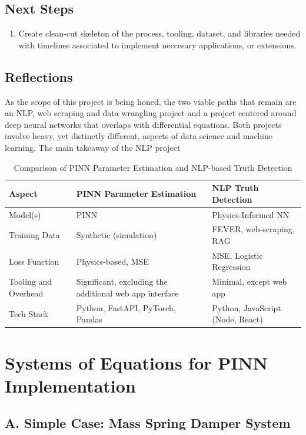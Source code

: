 \documentclass[11pt,letterpaper]{article}
\newcommand{\nextSteps}[1]{
    \subsection*{Next Steps}
    #1
}
\newcommand{\reflections}[1]{
    \subsection*{Reflections}
    #1
}
\begin{document}
\nextSteps{
\begin{enumerate}
    \item Create clean-cut skeleton of the process, tooling, dataset, and libraries needed with timelines associated to implement neccesary applications, or extensions.
\end{enumerate}
}

\reflections{
As the scope of this project is being honed, the two viable paths that remain are an NLP, web scraping and data wrangling project and a project centered around deep neural networks that overlaps with differential equations. Both projects involve heavy, yet distinctly different, aspects of data science and machine learning. The main takeaway of the NLP project

\begin{table}[h!]
\centering
\begin{tabular}{|>{\centering\arraybackslash}p{3.5cm}|
                >{\centering\arraybackslash}p{5cm}|
                >{\centering\arraybackslash}p{5cm}|}
\hline
\textbf{Aspect} & \textbf{PINN Parameter Estimation} & \textbf{NLP Truth Detection} \\
\hline
Model(s) & PINN & Physics-Informed NN \\
Training Data & Synthetic (simulation) & FEVER, web-scraping, RAG \\
Loss Function & Physics-based, MSE & MSE, Logistic Regression \\
Tooling and Overhead & Significant, excluding the additional web app interface & Minimal, except web app \\
Tech Stack & Python, FastAPI, PyTorch, Pandas & Python, JavaScript (Node, React)\\
\hline
\end{tabular}
\caption{Comparison of PINN Parameter Estimation and NLP-based Truth Detection}
\end{table}


}


\newpage
\appendix
\section{Systems of Equations for PINN Implementation}
\subsection*{A. Simple Case: Mass Spring Damper System}
\end{document}
